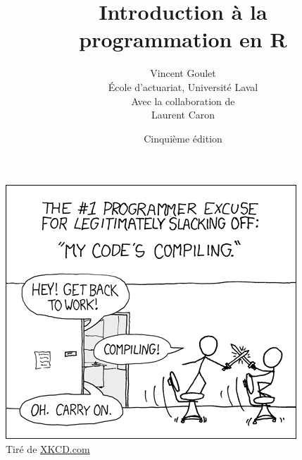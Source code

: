 \documentclass[letterpaper,11pt,x11names,english,french]{memoir}
\title{%
    \bfseries\fontsize{42}{42}\selectfont Introduction à la \\
                                          programmation en R}
\author{%
    \mdseries\fontsize{20}{20}\selectfont Vincent Goulet \\
    \mdseries\fontsize{14}{18}\selectfont École d'actuariat,
                                          Université Laval \\
                                          \vspace*{10mm}
    \mdseries\fontsize{14}{18}\selectfont Avec la collaboration de \\
    \mdseries\fontsize{20}{22}\selectfont Laurent Caron}
\date{%
    \mdseries\fontsize{14}{18}\selectfont Cinquième édition}
\newcommand{\ISBN}{978-2-9811416-6-8}
\theoremstyle{remark}
\begin{document}
\frontmatter


\cleardoublepage

\pagestyle{empty}


\clearpage


\clearpage

\pagestyle{companion}


\tableofcontents*

\cleartoverso
\thispagestyle{empty}
\begin{vplace}[0.45]
  \centering
  \begin{minipage}{351pt}
    \includegraphics{compiling.png} \\
    \footnotesize\sffamily%
    Tiré de \href{http://xkcd.com/303/}{XKCD.com}
  \end{minipage}
\end{vplace}

\mainmatter










\appendix








\cleardoublepage
\printindex

\cleartoverso



\cleartoverso


\end{document}
